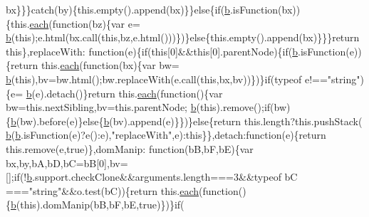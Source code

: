 \begin{DoxyCode}
      bx\}\}\}\textcolor{keywordflow}{catch}(by)\{this.empty().append(bx)\}\}\textcolor{keywordflow}{else}\{\textcolor{keywordflow}{if}(\hyperlink{jquery_8js_aa4026ad5544b958e54ce5e106fa1c805}{b}.isFunction(bx))\{this.\hyperlink{jquery_8js_a871ff39db627c54c710a3e9909b8234c}{each}(\textcolor{keyword}{function}(bz)\{var e=
      \hyperlink{jquery_8js_aa4026ad5544b958e54ce5e106fa1c805}{b}(\textcolor{keyword}{this});e.html(bx.call(\textcolor{keyword}{this},bz,e.html()))\})\}\textcolor{keywordflow}{else}\{this.empty().append(bx)\}\}\}\textcolor{keywordflow}{return} \textcolor{keyword}{this}\},replaceWith:\textcolor{keyword}{
      function}(e)\{\textcolor{keywordflow}{if}(\textcolor{keyword}{this}[0]&&\textcolor{keyword}{this}[0].parentNode)\{\textcolor{keywordflow}{if}(\hyperlink{jquery_8js_aa4026ad5544b958e54ce5e106fa1c805}{b}.isFunction(e))\{\textcolor{keywordflow}{return} this.\hyperlink{jquery_8js_a871ff39db627c54c710a3e9909b8234c}{each}(\textcolor{keyword}{function}(bx)\{var bw=
      \hyperlink{jquery_8js_aa4026ad5544b958e54ce5e106fa1c805}{b}(\textcolor{keyword}{this}),bv=bw.html();bw.replaceWith(e.call(\textcolor{keyword}{this},bx,bv))\})\}\textcolor{keywordflow}{if}(typeof e!==\textcolor{stringliteral}{"string"})\{e=
      \hyperlink{jquery_8js_aa4026ad5544b958e54ce5e106fa1c805}{b}(e).detach()\}\textcolor{keywordflow}{return} this.\hyperlink{jquery_8js_a871ff39db627c54c710a3e9909b8234c}{each}(\textcolor{keyword}{function}()\{var bw=this.nextSibling,bv=this.parentNode;
      \hyperlink{jquery_8js_aa4026ad5544b958e54ce5e106fa1c805}{b}(\textcolor{keyword}{this}).remove();\textcolor{keywordflow}{if}(bw)\{\hyperlink{jquery_8js_aa4026ad5544b958e54ce5e106fa1c805}{b}(bw).before(e)\}\textcolor{keywordflow}{else}\{\hyperlink{jquery_8js_aa4026ad5544b958e54ce5e106fa1c805}{b}(bv).append(e)\}\})\}\textcolor{keywordflow}{else}\{\textcolor{keywordflow}{return} this.length?this.pushStack(
      \hyperlink{jquery_8js_aa4026ad5544b958e54ce5e106fa1c805}{b}(\hyperlink{jquery_8js_aa4026ad5544b958e54ce5e106fa1c805}{b}.isFunction(e)?e():e),\textcolor{stringliteral}{"replaceWith"},e):\textcolor{keyword}{this}\}\},detach:\textcolor{keyword}{function}(e)\{\textcolor{keywordflow}{return} this.\textcolor{keyword}{remove}(e,\textcolor{keyword}{true})\},domManip:\textcolor{keyword}{
      function}(bB,bF,bE)\{var bx,by,bA,bD,bC=bB[0],bv=[];\textcolor{keywordflow}{if}(!\hyperlink{jquery_8js_aa4026ad5544b958e54ce5e106fa1c805}{b}.support.checkClone&&arguments.length===3&&typeof bC
      ===\textcolor{stringliteral}{"string"}&&o.test(bC))\{\textcolor{keywordflow}{return} this.\hyperlink{jquery_8js_a871ff39db627c54c710a3e9909b8234c}{each}(\textcolor{keyword}{function}()\{\hyperlink{jquery_8js_aa4026ad5544b958e54ce5e106fa1c805}{b}(\textcolor{keyword}{this}).domManip(bB,bF,bE,\textcolor{keyword}{true})\})\}\textcolor{keywordflow}{if}(

\end{DoxyCode}
